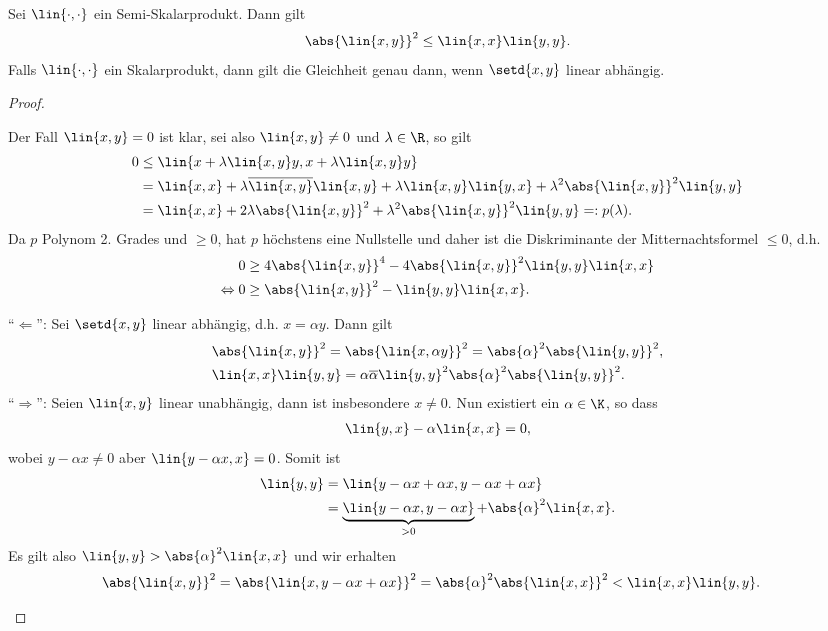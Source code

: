\begin{prop}
\label{prop:5.2}
Sei $\lin{\cdot,\cdot}$ ein Semi-Skalarprodukt. Dann gilt
\begin{align*}
\abs{\lin{x,y}}^2 \le \lin{x,x}\lin{y,y}.
\end{align*}
Falls $\lin{\cdot,\cdot}$ ein Skalarprodukt, dann gilt die Gleichheit genau
dann, wenn $\setd{x,y}$ linear abhängig.\fishhere
\end{prop}
\begin{proof}
\begin{proofenum}
\item Der Fall $\lin{x,y}=0$ ist klar, sei also $\lin{x,y}\neq 0$ und
$\lambda\in\R$, so gilt
\begin{align*}
0 &\le \lin{x+\lambda \lin{x,y}y,x+\lambda\lin{x,y}y}\\
&= \lin{x,x} + \lambda\overline{\lin{x,y}}\lin{x,y} + \lambda\lin{x,y}\lin{y,x}
+ \lambda^2\abs{\lin{x,y}}^2\lin{y,y}\\
&= \lin{x,x} + 2\lambda\abs{\lin{x,y}}^2 + \lambda^2\abs{\lin{x,y}}^2\lin{y,y}
=: p(\lambda).
\end{align*}
Da $p$ Polynom 2. Grades und $\ge 0$, hat $p$ höchstens eine Nullstelle und
daher ist die Diskriminante der Mitternachtsformel $\le 0$, d.h.
\begin{align*}
&0 \ge 4\abs{\lin{x,y}}^4 - 4 \abs{\lin{x,y}}^2\lin{y,y}\lin{x,x}\\
\Leftrightarrow\;
&0 \ge \abs{\lin{x,y}}^2 - \lin{y,y}\lin{x,x}.
\end{align*}
\item ``$\Leftarrow$'': Sei $\setd{x,y}$ linear abhängig, d.h. $x = \alpha y$.
Dann gilt
\begin{align*}
&\abs{\lin{x,y}}^2 = \abs{\lin{x,\alpha y}}^2 = \abs{\alpha}^2
\abs{\lin{y,y}}^2,\\
&\lin{x,x}\lin{y,y} = \alpha\overline{\alpha}\lin{y,y}^2
\abs{\alpha}^2\abs{\lin{y,y}}^2.
\end{align*}
``$\Rightarrow$'': Seien $\lin{x,y}$ linear unabhängig, dann ist insbesondere
$x\neq 0$. Nun existiert ein $\alpha\in\K$, so dass
\begin{align*}
\lin{y,x}-\alpha\lin{x,x} = 0,
\end{align*}
wobei $y-\alpha x \neq 0$ aber
$\lin{y-\alpha x,x}=0$. Somit ist
\begin{align*}
\lin{y,y} &= \lin{y-\alpha x+\alpha x,y-\alpha x + \alpha x}\\
&= \underbrace{\lin{y-\alpha x,y-\alpha x}}_{>0} + \abs{\alpha}^2 \lin{x,x}.
\end{align*}
Es gilt also $\lin{y,y} > \abs{\alpha}^2\lin{x,x}$ und wir erhalten
\begin{align*}
&\abs{\lin{x,y}}^2 = \abs{\lin{x,y-\alpha x + \alpha x}}^2 =
\abs{\alpha}^2\abs{\lin{x,x}}^2 < \lin{x,x}\lin{y,y}.\qedhere
\end{align*}
\end{proofenum}
\end{proof}

